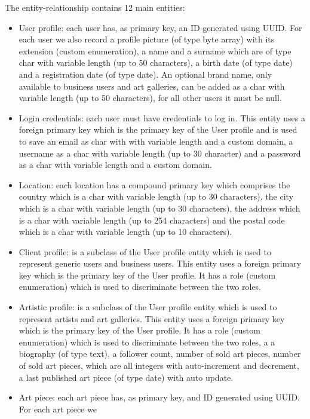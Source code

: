 The entity-relationship contains 12 main entities:
\begin{itemize}
    \item User profile: each user has, as primary key, an ID generated using UUID. For each user we also record
    a profile picture (of type byte array) with its extension (custom enumeration), a name and a surname which
    are of type char with variable length (up to 50 characters), a birth date (of type date) and a registration
    date (of type date). An optional brand name, only available to business users and art galleries, can be added
     as a char with variable length (up to 50 characters), for all other users it must be null.
    \item Login credentials: each user must have credentials to log in. This entity uses a foreign primary key 
    which is the primary key of the User profile and is used to save an email as char with with variable length 
    and a custom domain, a username as a char with variable length (up to 30 character) and a password as a char
     with variable length and a custom domain.
    \item Location: each location has a compound primary key which comprises the country which is a char with 
    variable length (up to 30 characters), the city which is a char with variable length (up to 30 characters), the
     address which is a char with variable length (up to 254 characters) and the postal code which is a char with 
     variable length (up to 10 characters).
    \item Client profile: is a subclass of the User profile entity which is used to represent generic users and 
    business users. This entity uses a foreign primary key which is the primary key of the User profile. It has a
     role (custom enumeration) which is used to discriminate between the two roles.
    \item Artistic profile: is a subclass of the User profile entity which is used to represent artists and art 
    galleries. This entity uses a foreign primary key which is the primary key of the User profile. It has a role 
    (custom enumeration) which is used to discriminate between the two roles, a 
    a biography (of type text), a follower count, number of sold art pieces, number of sold art pieces, which are
    all integers with auto-increment and decrement, a last published art piece (of type date) with auto update.
    \item Art piece: each art piece has, as primary key, and ID generated using UUID. For each art piece we 

\end{itemize}
